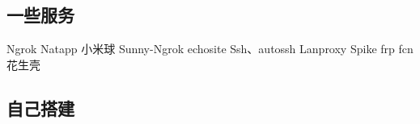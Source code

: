 
\begin{issues}
\issueDraft
\end{issues}

\subsection{一些服务}
Ngrok
Natapp
小米球
Sunny-Ngrok
echosite
Ssh、autossh
Lanproxy
Spike
frp
fcn
花生壳

\subsection{自己搭建}